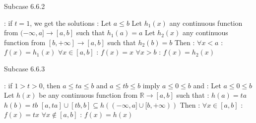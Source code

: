 \begin{solution}
\begin{bolded}Subcase 6.6.2\end{bolded} : if $t=1$, we get the solutions :
Let $a\le b$
Let $h_1(x)$ any continuous function from $(-\infty,a]\to[a,b]$ such that $h_1(a)=a$
Let $h_2(x)$ any continuous function from $[b,+\infty]\to[a,b]$ such that $h_2(b)=b$
Then :
$\forall x<a$ : $f(x)=h_1(x)$
$\forall x\in[a,b]$ : $f(x)=x$
$\forall x>b$ : $f(x)=h_2(x)$

\begin{bolded}Subcase 6.6.3\end{bolded} : if $1>t>0$, then $a\le ta\le b$ and $a\le tb\le b$ imply $a\le 0\le b$ and :
Let $a\le 0\le b$
Let $h(x)$ be any continuous function from $\mathbb R\to[a,b]$ such that :
$h(a)=ta$
$h(b)=tb$
$[a,ta]\cup[tb,b]\subseteq h((-\infty,a]\cup[b,+\infty))$
Then :
$\forall x\in[a,b]$ : $f(x)=tx$
$\forall x\notin[a,b]$ : $f(x)=h(x)$

\end{solution}




